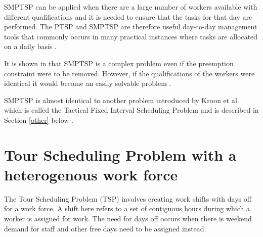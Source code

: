 SMPTSP can be applied when there are a large number of workers available with different qualifications and it is needed to ensure that the tasks for that day are performed. The PTSP and SMPTSP are therefore useful day-to-day management tools that commonly occurs in many practical instances where tasks are allocated on a daily basis \citet{krishnamoorthy_2011}.

It is shown in \citet{kroon_1997} that SMPTSP is a complex problem even if the preemption constraint were to be removed. However, if the qualifications of the workers were identical it would become an easily solvable problem \citet{krishnamoorthy_2011}.

SMPTSP is almost identical to another problem introduced by Kroon et al. which is called the Tactical Fixed Interval Scheduling Problem and is described in Section \ref{other} below \citet{krishnamoorthy_2011}.




 

%
%
%
%


\section{Tour Scheduling Problem with a heterogenous work force}\label{TSP}

The Tour Scheduling Problem (TSP) involves creating work shifts with days off for a work force. A shift here refers to a set of contiguous hours during which a worker is assigned for work. The need for days off occurs when there is weekend demand for staff and other free days need to be assigned instead. 

